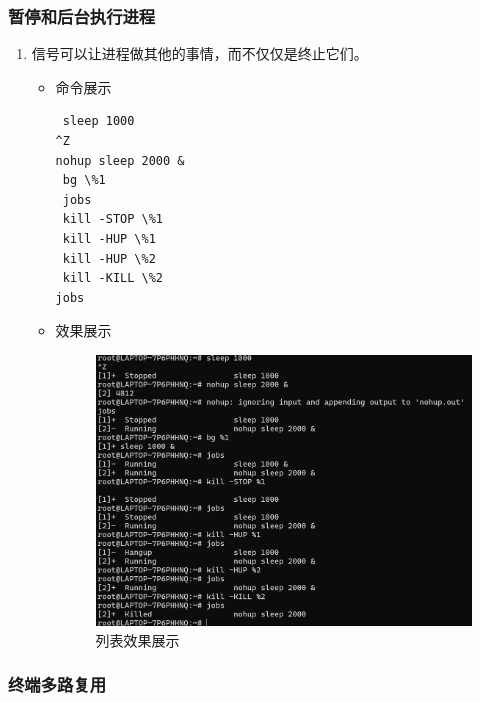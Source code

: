 \documentclass[UTF8]{ctexart}
\begin{document}
\subsubsection{暂停和后台执行进程}

\begin{enumerate}
  \item 信号可以让进程做其他的事情，而不仅仅是终止它们。
  \begin{itemize}
  \item 命令展示
  \begin{verbatim}
 sleep 1000
^Z
nohup sleep 2000 &
 bg \%1
 jobs
 kill -STOP \%1
 kill -HUP \%1
 kill -HUP \%2
 kill -KILL \%2
jobs
  \end{verbatim}
\item 效果展示
  \begin{figure}[H]
    \centering
    \includegraphics[width=\textwidth]{12} %
    \caption{列表效果展示}
  \end{figure}
  \end{itemize}
\end{enumerate}

\subsubsection{终端多路复用}
\end{document}
